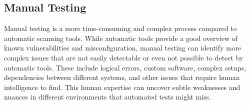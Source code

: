 \subsection{Manual Testing}
Manual testing is a more time-consuming and complex process compared to automatic scanning tools.
While automatic tools provide a good overview of known vulnerabilities and misconfiguration, manual testing can identify more complex issues that are not easily detectable or even not possible to detect by automatic tools.
These include logical errors, custom software, complex setups, dependencies between different systems, and other issues that require human intelligence to find.
This human expertise can uncover subtle weaknesses and nuances in different environments that automated tests might miss.

